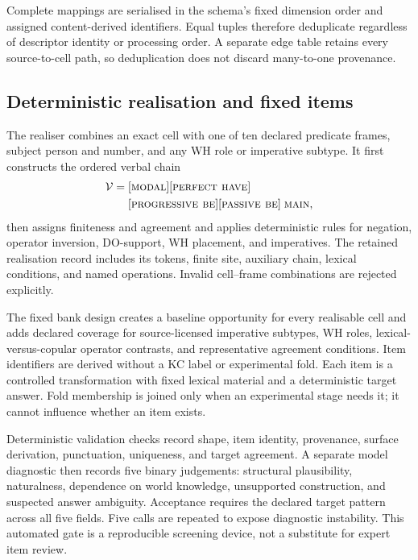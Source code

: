 Complete mappings are serialised in the schema's fixed dimension order and
assigned content-derived identifiers.  Equal tuples therefore deduplicate
regardless of descriptor identity or processing order.  A separate edge table
retains every source-to-cell path, so deduplication does not discard
many-to-one provenance.

\subsection{Deterministic realisation and fixed items}

The realiser combines an exact cell with one of ten declared predicate frames,
subject person and number, and any WH role or imperative subtype.  It first
constructs the ordered verbal chain
\begin{align}
 \mathcal{V}={}&[\textsc{modal}][\textsc{perfect have}]\notag\\
               & [\textsc{progressive be}][\textsc{passive be}]\;\textsc{main},
\end{align}
then assigns finiteness and agreement and applies deterministic rules for
negation, operator inversion, DO-support, WH placement, and imperatives.  The
retained realisation record includes its tokens, finite site, auxiliary chain,
lexical conditions, and named operations.  Invalid cell--frame combinations
are rejected explicitly.

The fixed bank design creates a baseline opportunity for every realisable
cell and adds declared coverage for source-licensed imperative subtypes, WH
roles, lexical-versus-copular operator contrasts, and representative agreement
conditions.  Item identifiers are derived without a KC label or experimental
fold.  Each item is a controlled transformation with fixed lexical material
and a deterministic target answer.  Fold membership is joined only when an
experimental stage needs it; it cannot influence whether an item exists.

Deterministic validation checks record shape, item identity, provenance,
surface derivation, punctuation, uniqueness, and target agreement.  A separate
model diagnostic then records five binary judgements: structural plausibility,
naturalness, dependence on world knowledge, unsupported construction, and
suspected answer ambiguity.  Acceptance requires the declared target pattern
across all five fields.  Five calls are repeated to expose diagnostic
instability.  This automated gate is a reproducible screening device, not a
substitute for expert item review.

